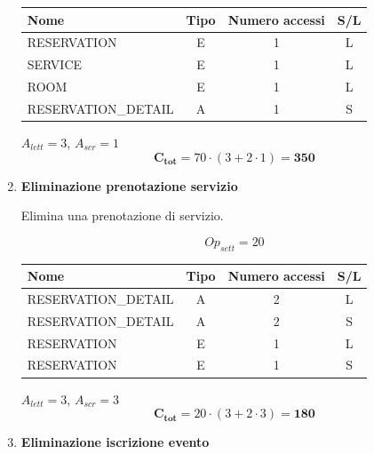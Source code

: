 \documentclass[a4paper,12pt]{report}
\begin{document}
\begin{enumerate}
    \begin{table}[H]
        \centering
        \small
        \renewcommand{\arraystretch}{1.15}
        \begin{tabularx}{0.8\textwidth}{|X|c|c|c|}
            \hline
            \rowcolor{gray!20}
            \textbf{Nome} & \textbf{Tipo} & \textbf{Numero accessi} & \textbf{S/L} \\
            \hline
            RESERVATION & E & 1 & L \\
            SERVICE & E & 1 & L \\
            ROOM & E & 1 & L \\
            RESERVATION\_DETAIL & A & 1 & S \\
            \hline
        \end{tabularx}
    \end{table}
    
    $A_{lett} = 3$, $A_{scr} = 1$
    $$\mathbf{C_{tot}} = 70 \cdot (3 + 2 \cdot 1) = \mathbf{350}$$

    \item {\large \textbf{Eliminazione prenotazione servizio}} \label{op16}
    
    Elimina una prenotazione di servizio.
    
    $$Op_{sett} = 20$$
    
    \begin{table}[H]
        \centering
        \small
        \renewcommand{\arraystretch}{1.15}
        \begin{tabularx}{0.8\textwidth}{|X|c|c|c|}
            \hline
            \rowcolor{gray!20}
            \textbf{Nome} & \textbf{Tipo} & \textbf{Numero accessi} & \textbf{S/L} \\
            \hline
            RESERVATION\_DETAIL & A & 2 & L \\
            RESERVATION\_DETAIL & A & 2 & S \\
            RESERVATION & E & 1 & L \\
            RESERVATION & E & 1 & S \\
            \hline
        \end{tabularx}
    \end{table}
    
    $A_{lett} = 3$, $A_{scr} = 3$
    $$\mathbf{C_{tot}} = 20 \cdot (3 + 2 \cdot 3) = \mathbf{180}$$

    \item {\large \textbf{Eliminazione iscrizione evento}} \label{op17}
    

\end{enumerate}
\end{document}
